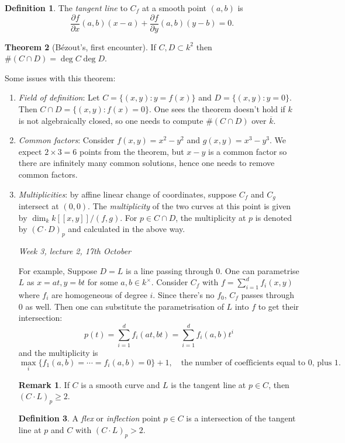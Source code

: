 \documentclass{article}
\theoremstyle{definition}
\newtheorem{defn}{Definition}[subsection]
\newtheorem{thm}[defn]{Theorem}
\newtheorem*{remark}{Remark}
\begin{document}
\begin{defn}
The \textit{tangent line} to $C_f$ at a smooth point $(a,b)$ is
\[
\frac{\partial f}{\partial x}(a,b)(x-a)+\frac{\partial f}{\partial y}(a,b)(y-b)=0.
\]
\end{defn}

\begin{thm}[Bézout's, first encounter]
If $C,D\subset k^2$ then $\#(C\cap D)=\deg C\deg D$.
\end{thm}
Some issues with this theorem:
\begin{enumerate}
\item \textit{Field of definition}: Let $C=\{(x,y):y=f(x)\}$ and $D=\{(x,y):y=0\}$. Then $C\cap D=\{(x,y):f(x)=0\}$. One sees the theorem doesn't hold if $k$ is not algebraically closed, so one needs to compute $\#(C\cap D)$ over $\overline k$.
\item \textit{Common factors}: Consider $f(x,y)=x^2-y^2$ and $g(x,y)=x^3-y^3$. We expect $2\times 3=6$ points from the theorem, but $x-y$ is a common factor so there are infinitely many common solutions, hence one needs to remove common factors.
\item \textit{Multiplicities}: by affine linear change of coordinates, suppose $C_f$ and $C_g$ intersect at $(0,0)$. The \textit{multiplicity} of the two curves at this point is given by $\dim_k k[\![x,y]\!]/(f,g)$. For $p\in C\cap D$, the multiplicity at $p$ is denoted by $(C\cdot D)_p$ and calculated in the above way.

\begin{flushright}
\textit{Week 3, lecture 2, 17th October}
\end{flushright}

For example, Suppose $D=L$ is a line passing through 0. One can parametrise $L$ as $x=at,y=bt$ for some $a,b\in k^\times$. Consider $C_f$ with $f=\sum_{i=1}^d f_i(x,y)$ where $f_i$ are homogeneous of degree $i$. Since there's no $f_0$, $C_f$ passes through 0 as well. Then one can substitute the parametrisation of $L$ into $f$ to get their intersection:
\[
p(t)=\sum_{i=1}^d f_i(at,bt)=\sum_{i=1}^d f_i(a,b)t^i
\]
and the multiplicity is
\[
\max_i\{f_1(a,b)=\cdots=f_i(a,b)=0\}+1,\quad \text{the number of coefficients equal to 0, plus 1}.
\]

\begin{remark}
If $C$ is a smooth curve and $L$ is the tangent line at $p\in C$, then $(C\cdot L)_p\geq 2$.
\end{remark}

\begin{defn}
A \textit{flex} or \textit{inflection} point $p\in C$ is a intersection of the tangent line at $p$ and $C$ with $(C\cdot L)_p>2$.
\end{defn}


\end{enumerate}
\end{document}
